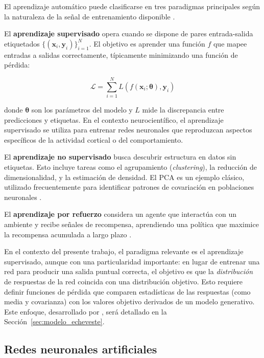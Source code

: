 El aprendizaje automático puede clasificarse en tres paradigmas principales según la naturaleza de la señal de entrenamiento disponible \citep{bishop2006pattern, murphy2012machine}.

El \textbf{aprendizaje supervisado} opera cuando se dispone de pares entrada-salida etiquetados $\{(\mathbf{x}_i, \mathbf{y}_i)\}_{i=1}^N$. El objetivo es aprender una función $f$ que mapee entradas a salidas correctamente, típicamente minimizando una función de pérdida:

\begin{equation}
\mathcal{L} = \sum_{i=1}^N L(f(\mathbf{x}_i; \boldsymbol{\theta}), \mathbf{y}_i)
\label{eq:supervised_loss}
\end{equation}

donde $\boldsymbol{\theta}$ son los parámetros del modelo y $L$ mide la discrepancia entre predicciones y etiquetas. En el contexto neurocientífico, el aprendizaje supervisado se utiliza para entrenar redes neuronales que reproduzcan aspectos específicos de la actividad cortical o del comportamiento.

El \textbf{aprendizaje no supervisado} busca descubrir estructura en datos sin etiquetas. Esto incluye tareas como el agrupamiento (\textit{clustering}), la reducción de dimensionalidad, y la estimación de densidad. El \acrfull{PCA} es un ejemplo clásico, utilizado frecuentemente para identificar patrones de covariación en poblaciones neuronales \citep{bishop2006pattern}.

El \textbf{aprendizaje por refuerzo} considera un agente que interactúa con un ambiente y recibe señales de recompensa, aprendiendo una política que maximice la recompensa acumulada a largo plazo \citep{bishop2006pattern}.

En el contexto del presente trabajo, el paradigma relevante es el aprendizaje supervisado, aunque con una particularidad importante: en lugar de entrenar una red para producir una salida puntual correcta, el objetivo es que la \textit{distribución} de respuestas de la red coincida con una distribución objetivo. Esto requiere definir funciones de pérdida que comparen estadísticas de las respuestas (como media y covarianza) con los valores objetivo derivados de un modelo generativo. Este enfoque, desarrollado por \cite{echeveste2020cortical}, será detallado en la Sección~\ref{sec:modelo_echeveste}.

\subsection{Redes neuronales artificiales}
\label{subsec:redes_artificiales}

